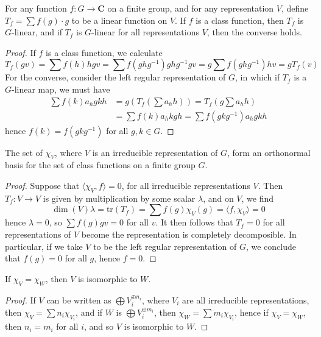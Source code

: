 \begin{theorem}
    For any function $f: G \to \mathbf{C}$ on a finite group, and for any representation $V$, define $T_f = \sum f(g) \cdot g$ to be a linear function on $V$. If $f$ is a class function, then $T_f$ is $G$-linear, and if $T_f$ is $G$-linear for all representations $V$, then the converse holds.
\end{theorem}
\begin{proof}
    If $f$ is a class function, we calculate
    \[ T_f(gv) = \sum f(h) hgv = \sum f(ghg^{-1}) ghg^{-1}gv = g \sum f(ghg^{-1}) hv = g T_f(v) \]
    For the converse, consider the left regular representation of $G$, in which if $T_f$ is a $G$-linear map, we must have
    \begin{align*}
        \sum f(k) a_h gkh &= g \left( T_f \left( \sum a_h h \right) \right) = T_f \left( g \sum a_h h \right)\\
        &= \sum f(k) a_h kgh = \sum f(gkg^{-1}) a_h gkh
    \end{align*}
    hence $f(k) = f(gkg^{-1})$ for all $g, k \in G$.
\end{proof}

\begin{theorem}
    The set of $\chi_V$, where $V$ is an irreducible representation of $G$, form an orthonormal basis for the set of class functions on a finite group $G$.
\end{theorem}
\begin{proof}
    Suppose that $\langle \chi_V, f \rangle = 0$, for all irreducible representations $V$. Then $T_f: V \to V$ is given by multiplication by some scalar $\lambda$, and on $V$, we find
    \[ \dim(V) \lambda = \text{tr}(T_f) = \sum f(g) \chi_V(g) = \langle f, \chi_V \rangle = 0 \]
    hence $\lambda = 0$, so $\sum f(g) gv = 0$ for all $v$. It then follows that $T_f = 0$ for all representations of $V$ become the representation is completely decomposible. In particular, if we take $V$ to be the left regular representation of $G$, we conclude that $f(g) = 0$ for all $g$, hence $f = 0$.
\end{proof}

\begin{corollary}
    If $\chi_V = \chi_W$, then $V$ is isomorphic to $W$.
\end{corollary}
\begin{proof}
    If $V$ can be written as $\bigoplus V_i^{\oplus n_i}$, where $V_i$ are all irreducible representations, then $\chi_V = \sum n_i \chi_{V_i}$, and if $W$ is $\bigoplus V_i^{\oplus m_i}$, then $\chi_W = \sum m_i \chi_{V_i}$, hence if $\chi_V = \chi_W$, then $n_i = m_i$ for all $i$, and so $V$ is isomorphic to $W$.
\end{proof}

